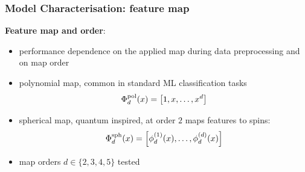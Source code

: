 \documentclass[xcolor=table,8pt]{beamer}
\begin{document}
    \begin{frame}[t]
        \frametitle{Model Characterisation: feature map}
        
        \textbf{Feature map and order}:
        \begin{itemize}
            \item performance dependence on the applied map during data preprocessing and on map order
            \item \alert{polynomial map}, common in standard ML classification tasks
                {\normalsize
                \begin{equation}
                    {
                        \Phi^{\text{pol}}_{d}(x) =  \qty[1, x, \dots ,  x^{d}]
                    }
                \end{equation}
                }
            \item \alert{spherical map}, quantum inspired, at order \( 2 \) maps features to spins:
                {\normalsize
                    \begin{equation}
                        {
                            \Phi^{\text{sph}}_{d}(x)=  \qty[\phi^{(1)}_{d}(x), \dots, \phi^{(d)}_{d}(x)]
                        }
                    \end{equation}
                }
            \item \alert{map orders \( d \in \{2,3,4,5\} \)} tested
        \end{itemize}


\end{frame}
\end{document}
